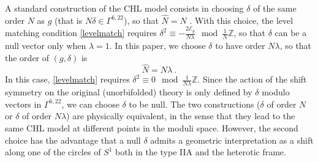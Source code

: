 \documentclass[a4paper,11pt]{article}
\newcommand{\ZZ}{\mathbb{Z}}
\newcommand{\C}{\mathcal{C}}
\newcommand{\E}{\mathcal{E}}
\newcommand{\N}{\mathcal{N}}
\numberwithin{equation}{section}
\def\be{\begin{equation}}
\def\ee{\end{equation}}
\begin{document}
A standard construction of the CHL model consists in choosing $\delta$ of the same order $N$ as $g$ (that is $N\delta\in \Gamma^{6,22}$), so that $\hat N=N$ \cite{Chaudhuri:1995ee}. With this choice, the level matching condition \eqref{levelmatch} requires $\delta^2\equiv -\frac{2\E_g}{N\lambda}\mod \frac{1}{N}\ZZ$, so that $\delta$ can be a null vector only when $\lambda=1$. In this paper, we choose $\delta$ to have order $N\lambda$, so that the order of $(g,\delta)$ is
\be \hat N=N\lambda\ .
\ee In this case, \eqref{levelmatch} requires $\delta^2\equiv 0\mod \frac{1}{N\lambda}\ZZ$. Since the action of the shift symmetry on the original (unorbifolded) theory is only defined by $\delta$ modulo vectors in $\Gamma^{6,22}$, we can choose $\delta$ to be null. The two constructions ($\delta$ of order $N$ or $\delta$ of order $N\lambda$) are physically equivalent, in the sense that they lead to the same CHL model at different points in the moduli space. 
However, the second choice has the advantage that a null $\delta$ admits a geometric interpretation as a shift along one of the circles of $S^1$ both in the type IIA and the heterotic frame. 

%
%
\end{document}
